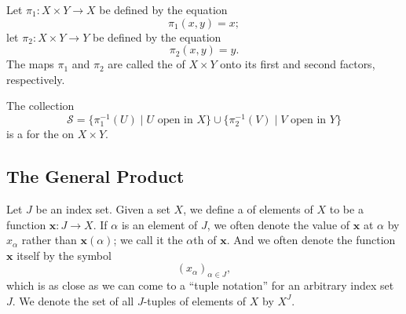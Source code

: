 \documentclass[../main.tex]{subfiles}
\begin{document}
\begin{definition}{}{}
Let $\pi_1 : X \times Y \to X$ be defined by the equation
\[
\pi_1(x, y) = x;
\]
let $\pi_2 : X \times Y \to Y$ be defined by the equation
\[
\pi_2(x, y) = y.
\]
The maps $\pi_1$ and $\pi_2$ are called the  of $X \times Y$ onto its first and second factors, respectively.
\end{definition}
\begin{theorem}{}{}
The collection
\[
\mathcal{S} = \{\pi_1^{-1}(U) \mid U \text{ open in } X\} \cup \{\pi_2^{-1}(V) \mid V \text{ open in } Y\}
\]
is a  for the  on $X \times Y$.
\end{theorem}

\subsection{The General Product}
\begin{definition}{}{}
Let $J$ be an index set. Given a set $X$, we define a  of elements of $X$ to be a function $\mathbf{x} : J \to X$. If $\alpha$ is an element of $J$, we often denote the value of $\mathbf{x}$ at $\alpha$ by $x_{\alpha}$ rather than $\mathbf{x}(\alpha)$; we call it the $\alpha$th  of $\mathbf{x}$. And we often denote the function $\mathbf{x}$ itself by the symbol
\[
(x_{\alpha})_{\alpha \in J},
\]
which is as close as we can come to a “tuple notation” for an arbitrary index set $J$. We denote the set of all $J$-tuples of elements of $X$ by $X^J$.
\end{definition}
\end{document}
